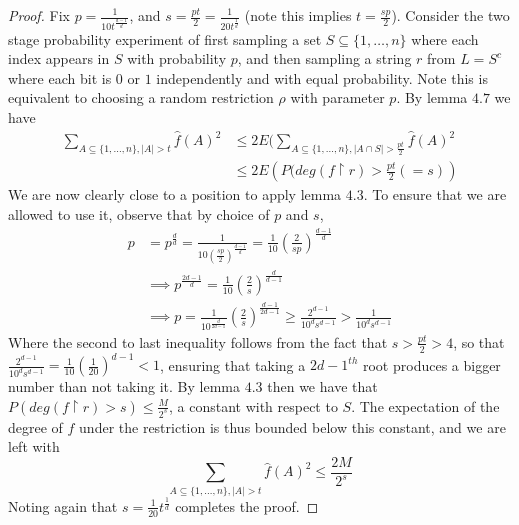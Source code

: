 \begin{proof}
	Fix $p = \frac{1}{10t^{\frac{d-1}{d}}}$, and $s = \frac{pt}{2} = \frac{1}{20t^{\frac{1}{d}}}$ (note this implies $t = \frac{sp}{2}$). Consider the two stage probability experiment of first sampling a set $S \subseteq \{1,\ldots,n\}$ where each index appears in $S$ with probability $p$, and then sampling a string $r$ from $L = S^c$ where each bit is $0$ or $1$ independently and with equal probability. Note this is equivalent to choosing a random restriction $\rho$ with parameter $p$. By lemma $4.7$ we have
	\begin{align*} \sum_{A \subseteq \{1,\ldots,n\}, |A| > t} \hat{f}(A)^2 &\leq 2E(\sum_{A \subseteq \{1,\ldots,n\},|A \cap S| > \frac{pt}{2}} \hat{f}(A)^2 \\
	&\leq 2E\left(P(deg(f\restriction r) > \frac{pt}{2} (= s)\right)
	\end{align*}
We are now clearly close to a position to apply lemma $4.3$. To ensure that we are allowed to use it, observe that by choice of $p$ and $s$,
\begin{align*} 
	p &= p^{\frac{d}{d}} = \frac{1}{10(\frac{sp}{2})^{\frac{d-1}{d}}} = \frac{1}{10}\left( \frac{2}{sp} \right)^{\frac{d-1}{d}}  \\
	&\implies p^{\frac{2d-1}{d}} = \frac{1}{10}\left( \frac{2}{s} \right)^{\frac{d}{d-1}} \\
	&\implies p = \frac{1}{10^{\frac{d}{2d-1}}} \left( \frac{2}{s} \right)^{\frac{d-1}{2d-1}} \geq \frac{2^{d-1}}{10^ds^{d-1}} > \frac{1}{10^ds^{d-1}} 
\end{align*}
Where the second to last inequality follows from the fact that $s > \frac{pt}{2} > 4$, so that $\frac{2^{d-1}}{10^ds^{d-1}} = \frac{1}{10}\left(\frac{1}{20} \right)^{d-1} < 1$, ensuring that taking a $2d-1^{th}$ root produces a bigger number than not taking it. By lemma $4.3$ then we have that $P(deg(f\restriction r) > s) \leq \frac{M}{2^s}$, a constant with respect to $S$. The expectation of the degree of $f$ under the restriction is thus bounded below this constant, and we are left with
\[ \sum_{A \subseteq \{1,\ldots,n\}, |A| > t} \hat{f}(A)^2 \leq \frac{2M}{2^s} \]
Noting again that $s = \frac{1}{20}t^{\frac{1}{d}}$ completes the proof. 
\end{proof}

